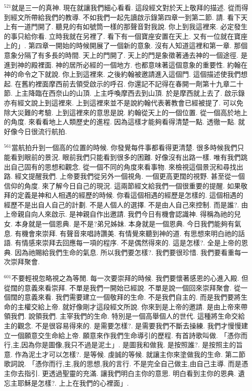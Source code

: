 \documentclass{book}
\begin{document}
$^{521}$就是三一的真神.
現在就讓我們細心看看.
這段經文對於天上敬拜的描述.
從而得到經文所帶給我們的教導.
不如我們一起先讀啟示錄第四章一到第二節.
請.
看下天上有一道門開了.
聽見的有如號筒一樣的那聲音對我說.
你上到我這裡來.
必定發生的事只給你看.
立時我就在另裡了.
看下有一個寶座安置在天上.
又有一位就在寶座上的」.
第四章一開始的時候開展了一個新的意象.
沒有人知道這裡和第一章.
那個意象分隔了有多長的時間.
天上的門開了.
天上的門是象徵著通去神的一個途徑.
是進到神的殿裡面.
神的居所必經的一個地方.
也都意味著這個意象的重要性.
約翰在神的命令之下就說.
你上到這裡來.
之後約翰被邀請進入這個門.
這個描述使我們想起.
在舊約裡面摩西前去領受啟示的呼召.
你還記不記得在春開一劑第十九章二十節.
上主降臨在西奈山的山頂.
上主呼喚摩西去到山頂.
於是摩西就上去了.
啟示錄亦有經文說上到這裡來.
上到這裡來並不是說約翰代表著教會已經被提了.
可以免除大災難的考驗.
上到這裡來的意思是說.
約翰從天上的一個位置.
從一個高於地上的角度.
來看看地上人類歷史的進程.
因為這樣才能夠看得清楚一點.
透徹一點.
就好像今日很流行航拍.

$^{561}$當航拍升到一個高的位置的時候.
你發覺每件事都看得更清楚.
很多時候我們只能看到眼前的景況.
眼前我們只能看到很多的困難.
好像沒有出路一樣.
唯有我們跳出自己固有的思想和觀念.
從一個不同的角度來看事物.
來檢視這個景況和尋找出路.
經文提醒我們.
上帝要我們從另外一個視角.
一個更高更闊的視野.
甚至從一個信仰的角度.
來了解今日自己的現況.
這兩節經文給我們一個很重要的提醒.
如果敬拜的定義是神和人相遇的經歷的時候.
你看這個相遇的經歷是怎樣的.
這個相遇的經歷不是出自人自己的計劃.
不是人個人的選擇.
不是由人自己來控制.
而是誰?.
由上帝親自向人來啟示.
是神親自作出邀請.
我們今日有機會認識神.
得稱為祂的兒女.
本身就是一個恩典.
是不是?弟兄姊妹.
本身就是一個恩典.
今日我們能夠有氣息.
有機會來崇拜.
有聲音來唱詩讚美.
有情覺來聽到神的道.
有思想來明白祂的話語.
有情感來崇拜去回應每一項的程序.
不是偶然得來的.
這是怎樣?.
全是上帝的恩典.
因為祂賜給我們生命的氣息.
所以我們要怎樣?.
我們要很珍惜.
我們要看重每一次崇拜聚會.

$^{601}$不要輕視忽略視之為等閒.
每一次要崇拜的時候.
我們要懷著感恩的心進入殿.
但從闊的意義來看崇拜.
不單是我們一開始已經說.
不單是說一個回來崇拜聚會.
從一個闊的意義來看.
我們需要建立一個敬拜的生命.
不是我們自主的.
而是我們要將生命的主權交給上帝.
就好像剛才這段經文所說.
你來到是上帝的邀請.
是由上帝來帶領我們.
說領我們.
主宰我們的生命.
特別是一個高舉個人的世代.
這種將生命交給主的觀念.
不是很容易得來的.
是需要怎樣?.
是需要我們不斷去操練.
我們才慢慢建立一個願意交生命給上帝.
願意來作我們生命導引的歷程.
有首詩歌叫做.
「憑你而行,主,因為你是圖像,我只不過是泥土」.
是圖我和做我.
是按照誰?.
是按照主的旨意.
作為泥土才可以怎樣?.
是等候.
虔誠的等候.
就讓主你來塗做我的生命.
第二節歌詞說.
「憑你而行,主,我的思想,我的言行.
不是完全自己做主,由自己主導.
而是憑主你去指引.
更透過聖靈的充滿.
讓我們明白主你的意思.
明白看到主你的恩典.
遺忘主耶穌是怎樣?.
上上在我們的心裡面」.
\end{document}
